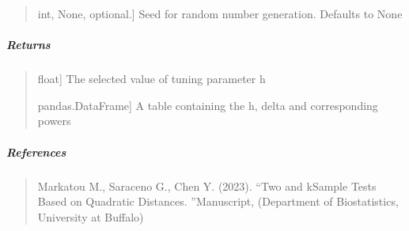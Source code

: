 \documentclass[letterpaper,10pt,english,openany,oneside]{sphinxmanual}
\begin{document}
{{{{\begin{fulllineitems}
\begin{quote}
\begin{description}
\sphinxlineitem{random\_state}{[}int, None, optional.{]}
\sphinxAtStartPar
Seed for random number generation. Defaults to None

\end{description}
\end{quote}


\subparagraph{Returns}
\label{\detokenize{api_reference/generated/QuadratiK.kernel_test.select_h:returns}}\begin{quote}
\begin{description}
\sphinxlineitem{h}{[}float{]}
\sphinxAtStartPar
The selected value of tuning parameter h

\sphinxlineitem{h vs Power table}{[}pandas.DataFrame{]}
\sphinxAtStartPar
A table containing the h, delta and corresponding powers

\end{description}
\end{quote}


\subparagraph{References}
\label{\detokenize{api_reference/generated/QuadratiK.kernel_test.select_h:references}}\begin{quote}

\sphinxAtStartPar
Markatou M., Saraceno G., Chen Y. (2023). “Two\sphinxhyphen{} and k\sphinxhyphen{}Sample Tests
Based on Quadratic Distances. ”Manuscript, (Department of Biostatistics,
University at Buffalo)
\end{quote}



\end{fulllineitems}}}}}
\end{document}
